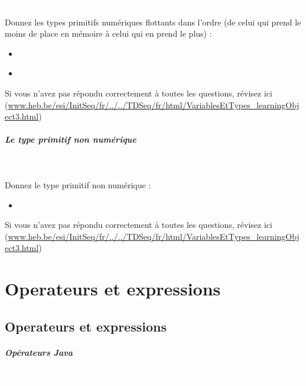 \documentclass[11pt,a4paper]{article}
\begin{document}
                \textcolor{white}{.} \par
             
								Donnez les types primitifs num\'eriques flottants dans l'ordre (de celui qui prend le moins de place en m\'emoire \`a celui qui en prend le plus) :
							
					\begin{itemize}
				
			\item  \textcolor{gray}{\underline{\hspace*{3em}}} 
			\item  \textcolor{gray}{\underline{\hspace*{5em}}} 
					\end{itemize}
				Si vous n'avez pas r\'epondu correctement \`a toutes les questions, 
				    r\'evisez ici (\url{www.heb.be/esi/InitSeq/fr/../../TDSeq/fr/html/VariablesEtTypes\_learningObject3.html})
            \par
        
			
		\subparagraph{Le type primitif non num\'erique} 
		
                \textcolor{white}{.} \par
             
								Donnez le type primitif non num\'erique :
							
					\begin{itemize}
				
			\item  \textcolor{gray}{\underline{\hspace*{5em}}} 
					\end{itemize}
				Si vous n'avez pas r\'epondu correctement \`a toutes les questions, 
          r\'evisez ici (\url{www.heb.be/esi/InitSeq/fr/../../TDSeq/fr/html/VariablesEtTypes\_learningObject3.html})
            \par
        \section{Operateurs et expressions}\subsection{Operateurs et expressions}
			
		\subparagraph{Op\'erateurs Java} 
		
                \textcolor{white}{.} \par
            
\end{document}
